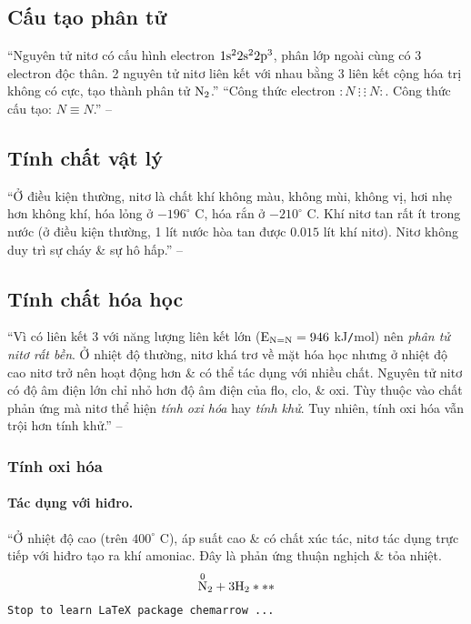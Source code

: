 \documentclass[oneside]{book}
\numberwithin{equation}{section}
\begin{document}
\subsection{Cấu tạo phân tử}
``Nguyên tử nitơ có cấu hình electron $\rm 1s^22s^22p^3$, phân lớp ngoài cùng có 3 electron độc thân. 2 nguyên tử nitơ liên kết với nhau bằng 3 liên kết cộng hóa trị không có cực, tạo thành phân tử $\rm N_2$.'' ``Công thức electron $:N\ \vdots\ \vdots\ N:$. Công thức cấu tạo: $N\equiv N$.'' -- \cite[p. 37]{SGK_Hoa_Hoc_11_nang_cao}

\subsection{Tính chất vật lý}
``Ở điều kiện thường, nitơ là chất khí không màu, không mùi, không vị, hơi nhẹ hơn không khí, hóa lỏng ở $-196^\circ$ C, hóa rắn ở $-210^\circ$ C. Khí nitơ tan rất ít trong nước (ở điều kiện thường, 1 lít nước hòa tan được $0.015$ lít khí nitơ). Nitơ không duy trì sự cháy \& sự hô hấp.'' -- \cite[p. 37]{SGK_Hoa_Hoc_11_nang_cao}

\subsection{Tính chất hóa học}
``Vì có liên kết 3 với năng lượng liên kết lớn ($\rm E_{N=N} = 946$ kJ\texttt{/}mol) nên \textit{phân tử nitơ rất bền}. Ở nhiệt độ thường, nitơ khá trơ về mặt hóa học nhưng ở nhiệt độ cao nitơ trở nên hoạt động hơn \& có thể tác dụng với nhiều chất. Nguyên tử nitơ có độ âm điện lớn chỉ nhỏ hơn độ âm điện của  flo, clo, \& oxi. Tùy thuộc vào chất phản ứng mà nitơ thể hiện \textit{tính oxi hóa} hay \textit{tính khử}. Tuy nhiên, tính oxi hóa vẫn trội hơn tính khử.'' -- \cite[p. 37]{SGK_Hoa_Hoc_11_nang_cao}

\subsubsection{Tính oxi hóa}

\paragraph{Tác dụng với hiđro.} ``Ở nhiệt độ cao (trên $400^\circ$ C), áp suất cao \& có chất xúc tác, nitơ tác dụng trực tiếp với hiđro tạo ra khí amoniac. Đây là phản ứng thuận nghịch \& tỏa nhiệt.
\begin{align*}
	\rm\overset{0}{N}_2 + 3H_2***
\end{align*}
\texttt{Stop to learn LaTeX package chemarrow ...}
\end{document}
